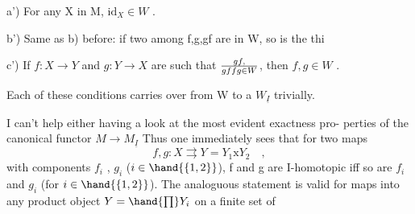 a') For any X in M, $\mathrm{id}_X\in W$ .

b') Same as b) before: if two among f,g,gf are in W, so is the thi

c') If $f\colon X\to Y$ and $g\colon Y\to X$ are such that $gf,\over{gf}{fg}\in W$, then $f,g\in W$ .

Each of these conditions carries over from W to a $W_{\underline{I}}$ trivially.

I can't help either having a look at the most evident exactness pro-%
perties of the canonical functor $M\to M_{\underline{I}}$  Thus one immediately sees
that for two maps
\[ f,g : X\rightrightarrows Y=Y_1\mathrm{x}Y_2 \quad , \]
with components $f_i$ , $g_i$ ($i\in\hand{\{1,2\}}$), f and g are I-homotopic  iff so are
$f_i$ and $g_i$ (for $i\in\hand{\{1,2\}}$). The analoguous statement is valid for  maps
into any product object $Y=\hand{\prod} Y_i$  on a finite set of

